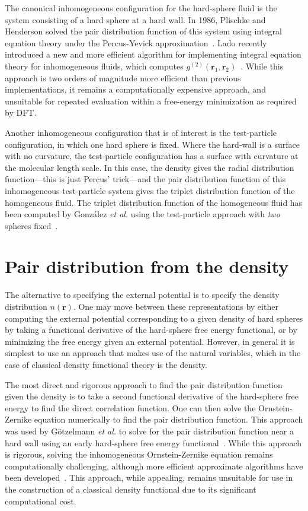 \documentclass[letterpaper,twocolumn,amsmath,amssymb,pre,aps,10pt]{revtex4-1}
\newcommand{\rr}{\textbf{r}}
\begin{document}
The canonical inhomogeneous configuration for the hard-sphere fluid is
the system consisting of a hard sphere at a hard wall.  In 1986,
Plischke and Henderson solved the pair distribution function of this
system using integral equation theory under the Percus-Yevick
approximation~\cite{plischke1986pair}.
%
Lado recently introduced a new and more efficient algorithm for
implementing integral equation theory for inhomogeneous fluids, which
computes $g^{(2)}(\rr_1,\rr_2)$~\cite{lado2009efficient}.  While this
approach is two orders of magnitude more efficient than previous
implementations, it remains a computationally expensive approach, and
unsuitable for repeated evaluation within a free-energy minimization
as required by DFT.

Another inhomogeneous configuration that is of interest is the
test-particle configuration, in which one hard sphere is fixed.  Where
the hard-wall is a surface with no curvature, the test-particle
configuration has a surface with curvature at the molecular length
scale.  In this case, the density gives the radial distribution
function---this is just Percus' trick---and the pair distribution
function of this inhomogeneous test-particle system gives the triplet
distribution function of the homogeneous fluid.  The triplet
distribution function of the homogeneous fluid has been computed by
Gonz\'alez \emph{et al.} using the test-particle approach with
\emph{two} spheres fixed~\cite{gonzalez1999test}.

\section{Pair distribution from the density}\label{sec:gn}

The alternative to specifying the external potential is to specify the
density distribution $n(\rr)$.  One may move between these
representations by either computing the external potential
corresponding to a given density of hard spheres by taking a
functional derivative of the hard-sphere free energy functional, or by
minimizing the free energy given an external potential.  However, in
general it is simplest to use an approach that makes use of the
natural variables, which in the case of classical density functional
theory is the density.

The most direct and rigorous approach to find the pair distribution
function given the density is to take a second functional derivative
of the hard-sphere free energy to find the direct correlation
function.  One can then solve the Ornstein-Zernike equation
numerically to find the pair distribution function.  This approach was
used by G{\"o}tzelmann \emph{et al.} to solve for the pair
distribution function near a hard wall using an early hard-sphere free
energy functional~\cite{gotzelmann1996structure}.  While this approach
is rigorous, solving the inhomogeneous Ornstein-Zernike equation
remains computationally challenging, although more efficient
approximate algorithms have been developed~\cite{paul2003variational}.
This approach, while appealing, remains unsuitable for use in the
construction of a classical density functional due to its significant
computational cost.
\end{document}
